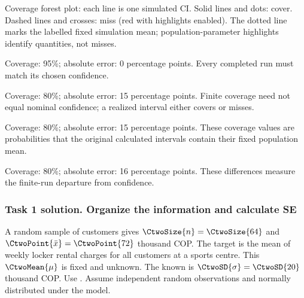 \begin{minipage}[t]{.69\linewidth}
\begin{center}
\par\small Coverage forest plot: each line is one simulated $\mathrm{CI}$.
Solid lines and dots: cover. Dashed lines and crosses: miss (red with highlights enabled).
The dotted line marks the labelled fixed simulation mean; population-parameter highlights identify quantities, not misses.
\end{center}
\end{minipage}\par

\clearpage
{}
\begin{answeroptions}
\item Coverage: 95\%; absolute error: 0 percentage points. Every completed run must match its chosen confidence.
\item Coverage: 80\%; absolute error: 15 percentage points. Finite coverage need not equal nominal confidence; a realized interval either covers or misses.
\item Coverage: 80\%; absolute error: 15 percentage points. These coverage values are probabilities that the original calculated intervals contain their fixed population mean.
\item Coverage: 80\%; absolute error: 16 percentage points. These differences measure the finite-run departure from confidence.
\end{answeroptions}
\clearpage
\subsubsection*{Task 1 solution. Organize the information and calculate SE}
\label{sol:c2-1-a}
A random sample of  customers gives $\CtwoSize{n}=\CtwoSize{64}$ and  $\CtwoPoint{\bar{x}}=\CtwoPoint{72}$ thousand COP. The target is the mean of weekly locker rental charges for all customers at a sports centre. This  $\CtwoMean{\mu}$ is fixed and unknown. The known  is $\CtwoSD{\sigma}=\CtwoSD{20}$ thousand COP. Use  . Assume independent random observations and normally distributed  under the model.

